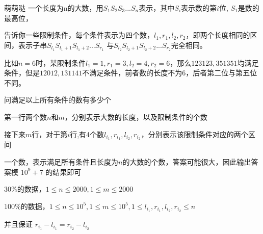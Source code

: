 \begin{problem}{萌萌哒}
一个长度为n的大数，用$S_1 S_2 S_3...S_n$表示，其中$S_i$表示数的第$i$位, $S_1$是数的最高位，

告诉你一些限制条件，每个条件表示为四个数，$l_1,r_1,l_2,r_2$，即两个长度相同的区间，表示子串$S_{l_1} S_{l_1+1} S_{l_1+2}...S_{r_1}$ 与$S_{l_2} S_{l_2+1} S_{l_2+2}...S_{r_2}$完全相同。

比如$n=6$时，某限制条件$l_1=1,r_1=3,l_2=4,r_2=6$，那么$123123,351351$均满足条件，但是$12012,131141$不满足条件，前者数的长度不为6，后者第二位与第五位不同。

问满足以上所有条件的数有多少个

\InputFile
第一行两个数$n$和$m$，分别表示大数的长度，以及限制条件的个数

接下来$m$行，对于第$i$行,有4个数$l_{i_1},r_{i_1},l_{i_2},r_{i_2}$，分别表示该限制条件对应的两个区间

\OutputFile
一个数，表示满足所有条件且长度为$n$的大数的个数，答案可能很大，因此输出答案模 $10^9+7$ 的结果即可

\Example
\begin{example}
%
\end{example}

\Note
$30\%$的数据，$1\leq n\leq 2000,1\leq m\leq2000$

$100\%$的数据，$1\leq n\leq 10^5,1\leq m\leq10^5,1\leq l_{i_1},r_{i_1},l_{i_2},r_{i_2}\leq n$

并且保证 $r_{i_1}-l_{i_1}=r_{i_2}-l_{i_2}$
\end{problem}


